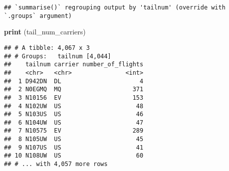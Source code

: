 \documentclass[
]{article}
\newenvironment{Shaded}{\begin{snugshade}}{\end{snugshade}}
\newcommand{\KeywordTok}[1]{\textcolor[rgb]{0.13,0.29,0.53}{\textbf{#1}}}
\newcommand{\NormalTok}[1]{#1}
\begin{document}
\begin{verbatim}
## `summarise()` regrouping output by 'tailnum' (override with `.groups` argument)
\end{verbatim}

\begin{Shaded}
\begin{Highlighting}[]
\KeywordTok{print}\NormalTok{ (tail_num_carriers)}
\end{Highlighting}
\end{Shaded}

\begin{verbatim}
## # A tibble: 4,067 x 3
## # Groups:   tailnum [4,044]
##    tailnum carrier number_of_flights
##    <chr>   <chr>               <int>
##  1 D942DN  DL                      4
##  2 N0EGMQ  MQ                    371
##  3 N10156  EV                    153
##  4 N102UW  US                     48
##  5 N103US  US                     46
##  6 N104UW  US                     47
##  7 N10575  EV                    289
##  8 N105UW  US                     45
##  9 N107US  US                     41
## 10 N108UW  US                     60
## # ... with 4,057 more rows
\end{verbatim}
\end{document}
